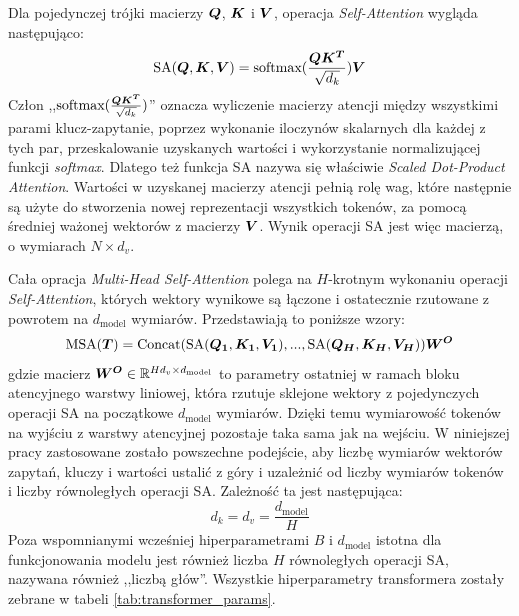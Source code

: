 Dla pojedynczej trójki macierzy $\boldsymbol{Q}$, $\boldsymbol{K}$ i $\boldsymbol{V}$, operacja
\emph{Self-Attention} wygląda następująco:
\begin{equation} \label{eq:sa}
    \textrm{SA}(\boldsymbol{Q}, \boldsymbol{K}, \boldsymbol{V}) = \textrm{softmax}(\frac{\boldsymbol{Q}\boldsymbol{K^T}}{\sqrt{d_k}})\boldsymbol{V}
\end{equation}
Człon ,,$\textrm{softmax}(\frac{\boldsymbol{Q}\boldsymbol{K^T}}{\sqrt{d_k}})$'' oznacza wyliczenie macierzy
atencji między wszystkimi parami klucz-zapytanie, poprzez wykonanie iloczynów skalarnych dla
każdej z tych par, przeskalowanie uzyskanych wartości i wykorzystanie normalizującej funkcji
\emph{softmax}. Dlatego też funkcja SA nazywa się właściwie \emph{Scaled Dot-Product Attention}.
Wartości w uzyskanej macierzy atencji pełnią rolę wag, które następnie są użyte do stworzenia
nowej reprezentacji wszystkich tokenów, za pomocą średniej ważonej wektorów z macierzy $\boldsymbol{V}$.
Wynik operacji SA jest więc macierzą, o wymiarach $N \times d_v$.

Cała opracja \emph{Multi-Head Self-Attention} polega na $H$-krotnym wykonaniu operacji
\emph{Self-Attention}, których wektory wynikowe są łączone i ostatecznie rzutowane z powrotem na
$d_{\mathrm{model}}$ wymiarów. Przedstawiają to poniższe wzory:
\begin{equation}
    \textrm{MSA}(\boldsymbol{T}) = \textrm{Concat}(\textrm{SA}(\boldsymbol{Q_1}, \boldsymbol{K_1}, \boldsymbol{V_1}), ..., \textrm{SA}(\boldsymbol{Q_H},
    \boldsymbol{K_H}, \boldsymbol{V_H}))\boldsymbol{W^O}
\end{equation}
gdzie macierz $\boldsymbol{W^O} \in \mathbb{R}^{Hd_v \times d_{\mathrm{model}}}$ to parametry ostatniej w ramach bloku
atencyjnego warstwy liniowej, która rzutuje sklejone wektory z pojedynczych operacji SA na
początkowe $d_{\mathrm{model}}$ wymiarów. Dzięki temu wymiarowość tokenów na wyjściu z warstwy
atencyjnej pozostaje taka sama jak na wejściu. W niniejszej pracy zastosowane zostało powszechne
podejście, aby liczbę wymiarów wektorów zapytań, kluczy i wartości ustalić z góry i uzależnić od
liczby wymiarów tokenów i liczby równoległych operacji SA. Zależność ta jest następująca:
\begin{equation}
    d_k = d_v = \frac{d_{\mathrm{model}}}{H}
\end{equation}
Poza wspomnianymi wcześniej hiperparametrami $B$ i $d_{\mathrm{model}}$ istotna dla funkcjonowania
modelu jest również liczba $H$ równoległych operacji SA, nazywana również ,,liczbą głów''. Wszystkie
hiperparametry transformera zostały zebrane w tabeli \ref{tab:transformer_params}.


